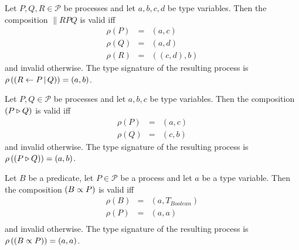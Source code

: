 \begin{definition}
\label{def:static_parallel}
Let $P, Q, R \in \mathcal{P}$ be processes and let $a, b, c, d$ be type variables. Then the composition $\parallel{R}{P}{Q}$ is valid iff
\begin{eqnarray*}
  \rho \left( P \right) & = & \left( a, c \right) \\
  \rho \left( Q \right) & = & \left( a, d \right) \\
  \rho \left( R \right) & = & \left( \left( c, d \right), b \right)
\end{eqnarray*}
and invalid otherwise. The type signature of the resulting process is $\rho \left( \left( R \gets P \, | \, Q \right) \right) = \left( a, b \right)$.

\hfill\qedsymbol
\end{definition}


\begin{definition}
\label{def:static_sequence}
Let $P, Q \in \mathcal{P}$ be processes and let $a, b, c$ be type variables. Then the composition $\left( P \triangleright Q \right)$ is valid iff
\begin{eqnarray*}
  \rho \left( P \right) & = & \left( a, c \right) \\
  \rho \left( Q \right) & = & \left( c, b \right)
\end{eqnarray*}
and invalid otherwise. The type signature of the resulting process is $\rho \left( \left( P \triangleright Q \right) \right) = \left( a, b \right)$.

\hfill\qedsymbol
\end{definition}


\begin{definition}
\label{def:static_repetition}
Let $B$ be a predicate, let $P \in \mathcal{P}$ be a process and let $a$ be a type variable. Then the composition $\left( B \propto P \right)$ is valid iff
\begin{eqnarray*}
  \rho \left( B \right) & = & \left( a, T_{Boolean} \right) \\
  \rho \left( P \right) & = & \left( a, a \right) \\
\end{eqnarray*}
and invalid otherwise. The type signature of the resulting process is $\rho \left( \left( B \propto P \right) \right) = \left( a, a \right)$.

\hfill\qedsymbol
\end{definition}



